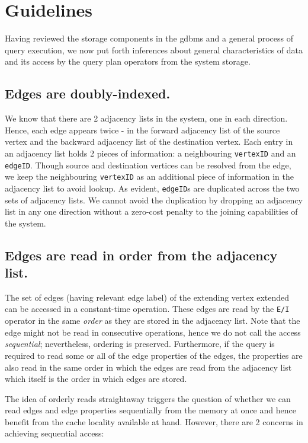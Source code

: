 \section{Guidelines}
\label{sec:guidelines}

Having reviewed the storage components in the \gls{gdbms} and a general process of query execution, we now put forth inferences about general characteristics of data and its access by the query plan operators from the system storage.

\subsection{Edges are doubly-indexed.}

We know that there are 2 adjacency lists in the system, one in each direction. Hence, each edge appears twice - in the forward adjacency list of the source vertex and the backward adjacency list of the destination vertex. Each entry in an adjacency list holds 2 pieces of information: a neighbouring \texttt{vertexID} and an \texttt{edgeID}. Though source and destination vertices can be resolved from the edge, we keep the neighbouring \texttt{vertexID} as an additional piece of information in the adjacency list to avoid lookup. As evident, \texttt{edgeID}s are duplicated across the two sets of adjacency lists. We cannot avoid the duplication by dropping an adjacency list in any one direction without a zero-cost penalty to the joining capabilities of the system.

\subsection{Edges are read in order from the adjacency list.}
\label{ssec:edges-ordered}

The set of edges (having relevant edge label) of the extending vertex extended can be accessed in a constant-time operation. These edges are read by the \texttt{E/I} operator in the same \emph{order} as they are stored in the adjacency list. Note that the edge might not be read in consecutive operations, hence we do not call the access \emph{sequential}; nevertheless, ordering is preserved. Furthermore, if the query is required to read some or all of the edge properties of the edges, the properties are also read in the same order in which the edges are read from the adjacency list which itself is the order in which edges are stored.

The idea of orderly reads straightaway triggers the question of whether we can read edges and edge properties sequentially from the memory at once and hence benefit from the cache locality available at hand. However, there are 2 concerns in achieving sequential access: 

